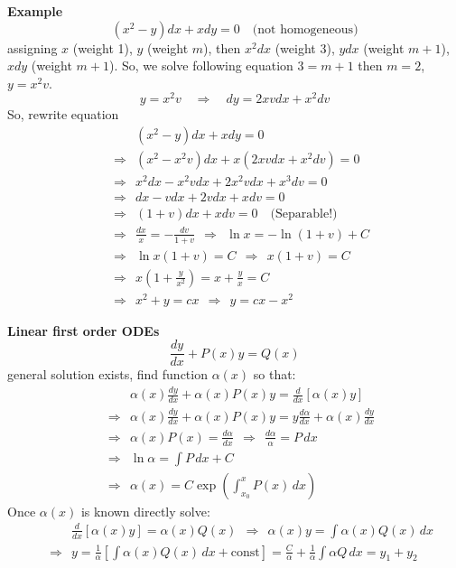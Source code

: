 \documentclass{article}
\begin{document}
\noindent
\textbf{Example}
\begin{equation}
    (x^2 - y)dx + xdy = 0 \quad \text{(not homogeneous)}
\end{equation}
assigning $x$ (weight 1), $y$ (weight $m$), then $x^2dx$ (weight 3), $ydx$ (weight $m+1$), $xdy$ (weight $m+1$). So, we solve following equation $3=m+1$ then $m=2$, $y = x^2v$.
\begin{equation}
    y = x^2 v \quad \Rightarrow \quad dy = 2xvdx + x^2 dv
\end{equation}
So, rewrite equation
\begin{align*}
    &\quad \quad (x^2 - y)dx + xdy = 0 \\ &\Rightarrow \ \ (x^2 - x^2 v)dx + x(2xvdx + x^2dv) = 0\\
    &\Rightarrow \ \  x^2dx - x^2 vdx + 2x^2 v dx + x^3 dv = 0\\
    &\Rightarrow \ \ dx-vdx +2vdx +xdv = 0\\ 
    &\Rightarrow \ \ (1+v)dx + xdv = 0 \quad (\text{Separable!)}\\
    &\Rightarrow \ \ \frac{dx}{x} = - \frac{dv}{1+v} \ \ \Rightarrow \ \ \ln{x} = - \ln{(1+v)} + C\\
    &\Rightarrow \ \  \ln{x}(1+v) = C \ \ \Rightarrow \ \ x(1+v) = C\\
    &\Rightarrow \ \  x\left( 1+\frac{y}{x^2} \right) = x+ \frac{y}{x} = C\\
    &\Rightarrow \ \ x^2 + y = cx \ \ \Rightarrow \ \ y = cx-x^2
\end{align*}

\vspace{2mm}\noindent
\textbf{Linear first order ODEs}
\begin{equation}
    \frac{dy}{dx} + P(x)y = Q(x)
\end{equation}
general solution exists, find function $\alpha(x)$ so that:
\begin{align*}
    &\quad \quad \alpha(x) \frac{dy}{dx} + \alpha(x) P(x) y = \frac{d}{dx} \left[ \alpha(x) y \right] \\
    &\Rightarrow \ \ \alpha(x) \frac{dy}{dx} + \alpha(x) P(x) y = y \frac{d\alpha}{dx} + \alpha(x) \frac{dy}{dx}\\
    &\Rightarrow \ \ \alpha(x) P(x) = \frac{d\alpha}{dx} \ \ \Rightarrow \ \ \frac{d\alpha}{\alpha} = P\,dx\\
    &\Rightarrow \ \ \ln \alpha = \int P\,dx + C\\
    &\Rightarrow \ \ \alpha(x) = C \exp\left( \int_{x_0}^{x} P(x)\,dx \right)
\end{align*}
Once $\alpha(x)$ is known directly solve:
\begin{align*}
    &\quad \quad \frac{d}{dx} \left[ \alpha(x)y \right] = \alpha(x)Q(x) \ \ \Rightarrow \ \ \alpha(x)y = \int \alpha(x)Q(x)\,dx \\
    &\Rightarrow \ \ y = \frac{1}{\alpha} \left[ \int \alpha(x) Q(x)\, dx + \text{const} \right] 
= \frac{C}{\alpha} + \frac{1}{\alpha} \int \alpha Q\, dx = y_1 + y_2
\end{align*}
\end{document}
